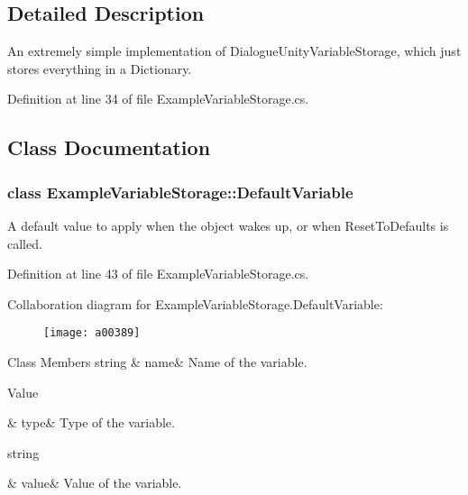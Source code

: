 \subsection{Detailed Description}
An extremely simple implementation of Dialogue\-Unity\-Variable\-Storage, which just stores everything in a Dictionary. 

Definition at line 34 of file Example\-Variable\-Storage.\-cs.



\subsection{Class Documentation}
\label{a00379}
\hypertarget{a00091_a00379}{}
\subsubsection{class Example\-Variable\-Storage\-:\-:Default\-Variable}
A default value to apply when the object wakes up, or when Reset\-To\-Defaults is called. 

Definition at line 43 of file Example\-Variable\-Storage.\-cs.



Collaboration diagram for Example\-Variable\-Storage.\-Default\-Variable\-:
\nopagebreak
\begin{figure}[H]
\begin{center}
\leavevmode
\texttt{[image: a00389]}
\end{center}
\end{figure}
\begin{DoxyFields}{Class Members}
\hypertarget{a00091_a609feaa53936e7dc42248ff2ba68454a}{string}\label{a00091_a609feaa53936e7dc42248ff2ba68454a}
&
name&
Name of the variable. \\
\hline

\hypertarget{a00091_a904347efdca12f40243c7dedb646153d}{Value}\label{a00091_a904347efdca12f40243c7dedb646153d}
&
type&
Type of the variable. \\
\hline

\hypertarget{a00091_a0f00ecb21b58aa754a4bbb61edf62818}{string}\label{a00091_a0f00ecb21b58aa754a4bbb61edf62818}
&
value&
Value of the variable. \\
\hline

\end{DoxyFields}


